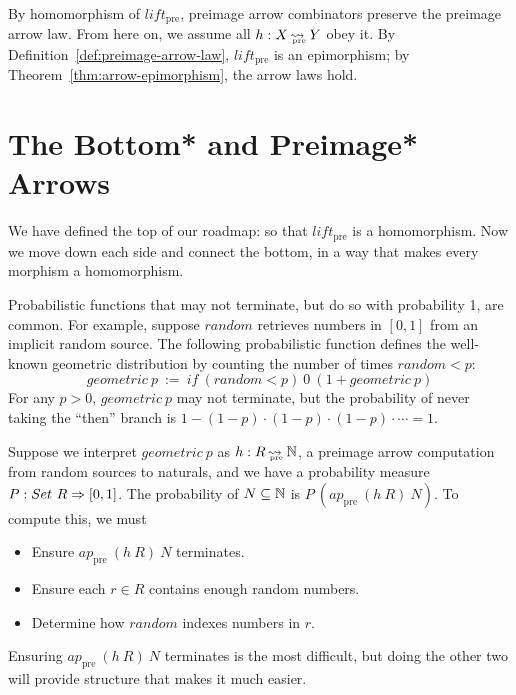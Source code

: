 \documentclass{llncs}
\newcommand{\arrow}{\rightsquigarrow}
\newcommand{\arrowlift}{\ensuremath{lift}}
\newcommand{\pre}{_\mathrm{pre}}
\DeclareMathOperator{\preto}{\arrow_{\mspace{-19mu}\pre}}
\newcommand{\liftpre}{\arrowlift\pre}
\begin{document}
By homomorphism of $\liftpre$, preimage arrow combinators preserve the preimage arrow law.
From here on, we assume all $h : X \preto Y$ obey it.
By Definition~\ref{def:preimage-arrow-law}, $\liftpre$ is an epimorphism; by Theorem~\ref{thm:arrow-epimorphism}, the arrow laws hold.


\section{The Bottom* and Preimage* Arrows}

We have defined the top of our roadmap:
so that $\liftpre$ is a homomorphism.
Now we move down each side and connect the bottom, in a way that makes every morphism a homomorphism.


Probabilistic functions that may not terminate, but do so with probability 1, are common.
For example, suppose $random$ retrieves numbers in $[0,1]$ from an implicit random source.
The following probabilistic function defines the well-known geometric distribution by counting the number of times $random < p$:
\begin{equation}
	geometric~p \ := \ if~(random < p)~0~(1 + geometric~p)
\label{eqn:geometric-def}
\end{equation}
For any $p > 0$, $geometric~p$ may not terminate, but the probability of never taking the ``then'' branch is $1 - (1-p) \cdot (1-p) \cdot (1-p) \cdot \cdots = 1$.

Suppose we interpret $geometric~p$ as $h : R \preto \Nat$, a preimage arrow computation from random sources to naturals, and we have a probability measure $P : Set~R \Rightarrow [0,1]$.
The probability of $N \subseteq \mathbb{N}$ is $P~(ap\pre~(h~R)~N)$.
To compute this, we must
\begin{itemize}
	\item Ensure $ap\pre~(h~R)~N$ terminates.
	\item Ensure each $r \in R$ contains enough random numbers.
	\item Determine how $random$ indexes numbers in $r$.
\end{itemize}
Ensuring $ap\pre~(h~R)~N$ terminates is the most difficult, but doing the other two will provide structure that makes it much easier.
\end{document}
